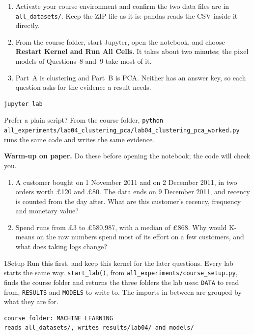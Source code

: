 \begin{labmode}
\begin{enumerate}
  \item Activate your course environment and confirm the two data files are in \texttt{all\_datasets/}. Keep the ZIP file as it is: pandas reads the CSV inside it directly.
  \item From the course folder, start Jupyter, open the notebook, and choose \textbf{Restart Kernel and Run All Cells}. It takes about two minutes; the pixel models of Questions~8 and~9 take most of it.
  \item Part~A is clustering and Part~B is PCA. Neither has an answer key, so each question asks for the evidence a result needs.
\end{enumerate}
\begin{lstlisting}[style=utpterminal]
jupyter lab
\end{lstlisting}
Prefer a plain script? From the course folder, \texttt{python all\_experiments/\allowbreak lab04\_clustering\_pca/\allowbreak lab04\_clustering\_pca\_worked.py} runs the same code and writes the same evidence.
\end{labmode}

\labroutine

\begin{yourturn}
\textbf{Warm-up on paper.} Do these before opening the notebook; the code will check you.
\begin{enumerate}
  \item A customer bought on 1 November 2011 and on 2 December 2011, in two orders worth \pounds 120 and \pounds 80. The data ends on 9 December 2011, and recency is counted from the day after. What are this customer's recency, frequency and monetary value?
  \item Spend runs from \pounds 3 to \pounds 580,987, with a median of \pounds 868. Why would K-means on the raw numbers spend most of its effort on a few customers, and what does taking logs change?
\end{enumerate}
\end{yourturn}

\begin{labquestion}{1}{Setup}
Run this first, and keep this kernel for the later questions. Every lab starts the same way. \texttt{start\_lab()}, from \texttt{all\_experiments/\allowbreak course\_setup.py}, finds the course folder and returns the three folders the lab uses: \texttt{DATA} to read from, \texttt{RESULTS} and \texttt{MODELS} to write to. The imports in between are grouped by what they are for.
\end{labquestion}
\begin{labanswer}

\begin{refoutput}
\begin{lstlisting}[style=utpterminal]
course folder: MACHINE LEARNING
reads all_datasets/, writes results/lab04/ and models/
\end{lstlisting}
\end{refoutput}
\end{labanswer}

